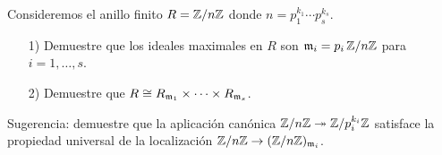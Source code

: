 %
%
%

\begin{ejercicio}
  Consideremos el anillo finito $R = \mathbb{Z}/n\mathbb{Z}$ donde
  $n = p_1^{k_1}\cdots p_s^{k_s}$.

  \begin{enumerate}
  \item[1)] Demuestre que los ideales maximales en $R$ son
    $\mathfrak{m}_i = p_i\,\mathbb{Z}/n\mathbb{Z}$ para $i = 1, \ldots, s$.

  \item[2)] Demuestre que
    $R \cong R_{\mathfrak{m}_1} \times \cdots \times R_{\mathfrak{m}_s}$.
  \end{enumerate}

  \noindent Sugerencia: demuestre que la aplicación canónica
  $\mathbb{Z}/n\mathbb{Z} \twoheadrightarrow \mathbb{Z}/p_i^{k_i}\mathbb{Z}$ satisface la propiedad universal de
  la localización $\mathbb{Z}/n\mathbb{Z} \to (\mathbb{Z}/n\mathbb{Z})_{\mathfrak{m}_i}$.
\end{ejercicio}

